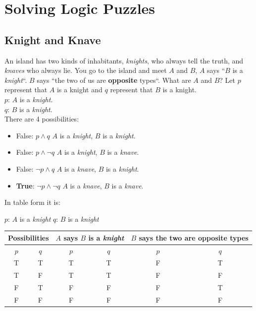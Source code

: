 \documentclass{article}
\begin{document}
\section{Solving Logic Puzzles}
\subsection{Knight and Knave}
An island has two kinds of inhabitants, \textit{knights}, who always tell the truth, and \textit{knaves} who always lie. You go to the island and meet $ A $ and $ B $, $ A $ says ``$ B $ is a \textit{knight}``. $ B $ says ``the two of us are \textbf{opposite} types``. What are $ A $ and $ B $? Let $ p $ represent that $ A $ is a knight and $ q $ represent that $ B $ is a knight.\\
$ p $: $ A $ is a \textit{knight}. \\
$ q $: $ B $ is a \textit{knight}. \\


There are 4 possibilities: 
\begin{itemize}
	\item False: $ p \land q $ $ A $ is a \textit{knight}, $ B $ is a \textit{knight}.
	\item False: $ p \land \neg q $ $ A $ is a \textit{knight}, $ B $ is a \textit{knave}.
	\item False: $ \neg p \land q $ $ A $ is a \textit{knave}, $ B $ is a \textit{knight}.
	\item \textbf{True}: $ \neg p \land \neg q $ $ A $ is a \textit{knave}, $ B $ is a \textit{knave}.
\end{itemize}

In table form it is: \\
\begin{center}
$ p $: $ A $ is a \textit{knight} $ q $: $ B $ is a \textit{knight}
\end{center}


\begin{center}
\begin{tabular}{|c|c|c|c|c|c|}
	\hline
	\multicolumn{2}{|c|}{Possibilities} & \multicolumn{2}{|c|}{$ A $ says $ B $ is a \textit{knight}} & \multicolumn{2}{|c|}{$ B $ says the two are \textbf{opposite} types} \\
	\hline
	$ p $ & $ q $ & $ p $ & $ q $ & $ p $ & $ q $ \\
	\hline
	\hline
	T & T & T & T & F & T \\
	T & F & T & T & F & F \\
	F & T & F & F & F & T \\
	F & F & F & F & F & F \\
	\hline
\end{tabular}
\end{center}
\end{document}
